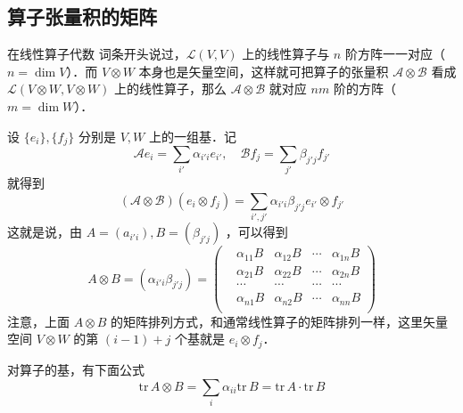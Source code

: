 \subsection{算子张量积的矩阵}
在线性算子代数 词条开头说过，$\mathcal L(V,V)$ 上的线性算子与 $n$ 阶方阵一一对应（ $n=\dim V$）．而 $V\otimes W$ 本身也是矢量空间，这样就可把算子的张量积 $\mathcal A\otimes \mathcal B$ 看成 $\mathcal L(V\otimes W,V\otimes W)$ 上的线性算子，那么 $\mathcal A\otimes \mathcal B$ 就对应 $nm$ 阶的方阵（$m=\dim W$）．

设 $\{e_i\},\{f_j\}$ 分别是 $V,W$ 上的一组基．记
\begin{equation}
\mathcal Ae_i=\sum_{i'}\alpha_{i'i}e_{i'},\quad \mathcal Bf_j=\sum_{j'}\beta_{j'j}f_{j'}
\end{equation}
就得到
\begin{equation}
(\mathcal A\otimes \mathcal B)(e_i\otimes f_j)=\sum_{i',j'}\alpha_{i'i}\beta_{j'j}e_{i'}\otimes f_{j'}
\end{equation}
这就是说，由 $A=(a_{i'i}),B=(\beta_{j'j})$ ，可以得到
\begin{equation}
A\otimes B=(\alpha_{i'i}\beta_{j'j})=
\begin{pmatrix}
&\alpha_{11}B&\alpha_{12}B&\cdots&\alpha_{1n}B\\
&\alpha_{21}B&\alpha_{22}B&\cdots&\alpha_{2n}B\\
&\cdots&\cdots&\cdots&\cdots\\
&\alpha_{n1}B&\alpha_{n2}B&\cdots&\alpha_{nn}B\\
\end{pmatrix}
\end{equation}
注意，上面 $A\otimes B$ 的矩阵排列方式，和通常线性算子的矩阵排列一样，这里矢量空间 $V\otimes W$ 的第 $(i-1)+j$ 个基就是 $e_i\otimes f_j$．

对算子的基，有下面公式
\begin{equation}
\mathrm{tr}\,A\otimes B=\sum_{i}\alpha_{ii}\mathrm{tr}\,B=\mathrm{tr}\,A\cdot\mathrm{tr}\,B
\end{equation}
